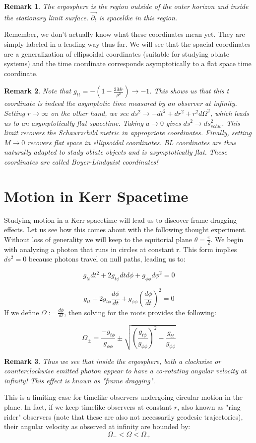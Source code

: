 \documentclass{article}
\newtheorem*{remark}{Remark}
\theoremstyle{definition}
\theoremstyle{remark}
\begin{document}
\begin{remark}
The ergosphere is the region outside of the outer horizon and inside the stationary limit surface.  $\Vec{\partial_t}$ is spacelike in this region.
\end{remark}


Remember, we don't actually know what these coordinates mean yet. They are simply labeled in a leading way thus far. We will see that the spacial coordinates are a generalization of ellipsoidal coordinates (suitable for studying oblate systems) and the time coordinate corresponds asymptotically to a flat space time coordinate.

\begin{remark}
Note that $g_{tt} = -(1- \frac{2Mr}{\rho^2}) \to -1$. This shows us that this t coordinate is indeed the asymptotic time measured by an observer at infinity. Setting $r \to \infty$ on the other hand, we see $ds^2 \to -dt^2 + dr^2 + r^2 d\Omega ^2$, which leads us to an asymptotically flat spacetime. Taking $a \to 0$ gives $ds^2 \to ds^2_{schw}$. This limit recovers the Schawrzchild metric in appropriate coordinates. Finally, setting $M \to 0$ recovers flat space in ellipsoidal coordinates. BL coordinates are thus naturally adapted to study oblate objects and is asymptotically flat. These coordinates are called Boyer-Lindquist coordinates!

\end{remark}

\section{Motion in Kerr Spacetime}
Studying motion in a Kerr spacetime will lead us to discover frame dragging effects. Let us see how this comes about with the following thought experiment. Without loss of generality we will keep to the equitorial plane $\theta = \frac{\pi}{2}$. We begin with analyzing a photon that runs in circles at constant r. This form implies $ds^2 = 0$ because photons travel on null paths, leading us to:

$$
g_{tt} dt^2 + 2 g_{t \phi} dt d\phi + g_{\phi \phi} d\phi^2 = 0
$$

$$
g_{tt} + 2g_{t \phi} \frac{d \phi}{dt} + g_{\phi \phi} (\frac{d \phi}{dt})^2 = 0
$$
If we define $\Omega := \frac{d \phi}{dt}$, then solving for the roots provides the following:

$$
\Omega_{\pm} = \frac{-g_{t \phi}}{g_{\phi \phi}} \pm \sqrt{(\frac{g_{t \phi}}{g_{\phi \phi}})^2 - \frac{g_{tt}}{g_{\phi \phi}}}
$$

\begin{remark}
Thus we see that inside the ergosphere, both a clockwise or counterclockwise emitted photon appear to have a co-rotating angular velocity at infinity! This effect is known as "frame dragging".
\end{remark}

This is a limiting case for timelike observers undergoing circular motion in the plane. In fact, if we keep timelike observers at constant $r$, also known as "ring rider" observers (note that these are also not necessarily geodesic trajectories), their angular velocity as observed at infinity are bounded by:
$$
\Omega_- < \Omega < \Omega_+
$$
\end{document}
